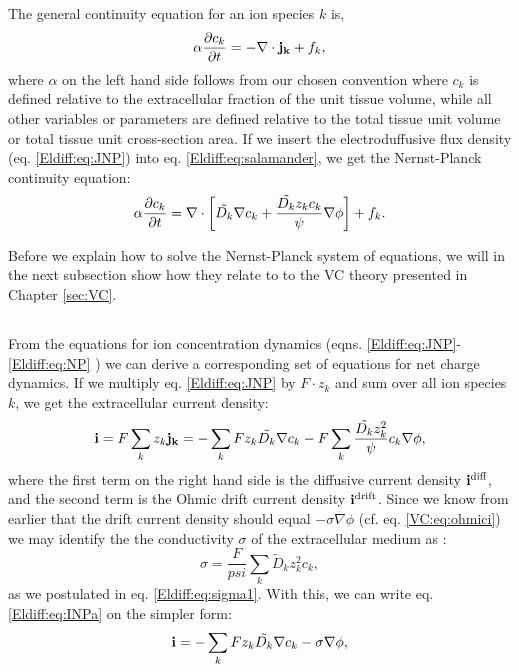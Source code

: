 The general continuity equation for an ion species $k$ is,
\begin{equation}
\alpha \frac{\partial c_k}{\partial t} = - \nabla \cdot {\bf j_k} + f_k,
\label{Eldiff:eq:salamander}
\end{equation}
where $\alpha$ on the left hand side follows from our chosen convention where $c_k$ is defined relative to the extracellular fraction of the unit tissue volume, while all other variables or parameters are defined relative to the total tissue unit volume or total tissue unit cross-section area. If we insert the electroduffusive flux density (eq. \ref{Eldiff:eq:JNP}) into eq. \ref{Eldiff:eq:salamander},
we get the Nernst-Planck continuity equation:
\begin{equation}
\alpha \frac{\partial c_k}{\partial t} = {\bf \nabla} \cdot \left[ \tilde{D_k} {\bf \nabla} c_k + \frac{\tilde{D_k} z_k c_k}{\psi} {\bf \nabla} \phi \right] + f_k.
\label{Eldiff:eq:NP}
\end{equation}

Before we explain how to solve the Nernst-Planck system of equations, we will in the next subsection show how they relate to to the VC theory presented in Chapter \ref{sec:VC}.


\subsection{}
\label{sec:Eldiff:electrodynamics}
From the equations for ion concentration dynamics (eqns. \ref{Eldiff:eq:JNP}-\ref{Eldiff:eq:NP} ) we can derive a corresponding set of equations for net charge dynamics. If we multiply eq. \ref{Eldiff:eq:JNP} by $F\cdot z_k$ and sum over all ion species $k$, we get the extracellular current density:
\begin{equation}
{\bf i} = F\sum_k {z_k {\bf j_k}} = -\sum_k{F z_k \tilde{D_k}{\bf \nabla} c_{k}} - F\sum_{k} \frac{\tilde{D_k} z_{k}^2}{\psi}c_{k} {\bf \nabla}{\phi}, 
\label{Eldiff:eq:INPa}
\end{equation}
where the first term on the right hand side is the diffusive current density ${\bf i^\text{diff}}$, and the second term is the Ohmic drift current density ${\bf i^\text{drift}}$. Since we know from earlier that the drift current density should equal $- \sigma \nabla \phi$  (cf. eq. \ref{VC:eq:ohmici}) we may identify the the conductivity $\sigma$ of the extracellular medium as \citep{Koch1999}:
\begin{equation}
\sigma = \frac{F}{psi}\sum_{k} \tilde{D}_k z_{k}^2 c_{k},
\label{Eldiff:eq:sigma}
\end{equation}
as we postulated in eq. \ref{Eldiff:eq:sigma1}. With this, we can write eq. \ref{Eldiff:eq:INPa} on the simpler form:
\begin{equation}
{\bf i} = - \sum_k{F z_k \tilde{D_k}{\bf \nabla} c_{k}} - \sigma{\bf \nabla}{\phi},
\label{Eldiff:eq:INP}
\end{equation}

